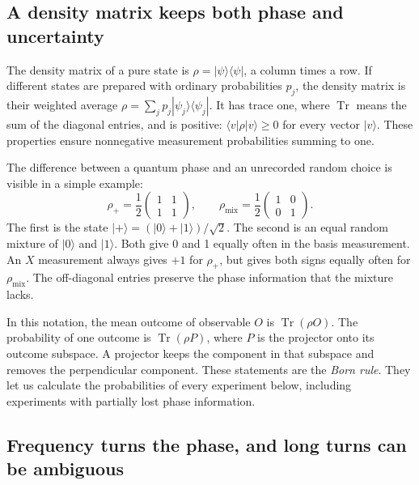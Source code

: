 \documentclass[11pt,a4paper]{article}
\numberwithin{equation}{section}
\theoremstyle{remark}
\DeclareMathOperator{\Tr}{Tr}
\begin{document}
\subsection{A density matrix keeps both phase and uncertainty}

The density matrix of a pure state is
$\rho=|\psi\rangle\langle\psi|$, a column times a row.
If different states are prepared with ordinary probabilities $p_j$, the
density matrix is their weighted average
$\rho=\sum_jp_j|\psi_j\rangle\langle\psi_j|$.
It has trace one, where $\Tr$ means the sum of the diagonal entries, and
is positive: $\langle v|\rho|v\rangle\ge0$ for every vector $|v\rangle$.
These properties ensure nonnegative measurement probabilities summing to one.

The difference between a quantum phase and an unrecorded random choice is
visible in a simple example:
\begin{equation}
 \rho_+=\frac12\begin{pmatrix}1&1\\1&1\end{pmatrix},
 \qquad
 \rho_{\mathrm{mix}}=\frac12\begin{pmatrix}1&0\\0&1\end{pmatrix}.
 \label{intro:mixture}
\end{equation}
The first is the state $|+\rangle=(|0\rangle+|1\rangle)/\sqrt2$.
The second is an equal random mixture of $|0\rangle$ and $|1\rangle$.
Both give 0 and 1 equally often in the basis measurement. An $X$ measurement
always gives $+1$ for $\rho_+$, but gives both signs equally often for
$\rho_{\mathrm{mix}}$. The off-diagonal entries preserve the phase
information that the mixture lacks.

In this notation, the mean outcome of observable $O$ is $\Tr(\rho O)$.
The probability of one outcome is $\Tr(\rho P)$, where $P$ is the projector
onto its outcome subspace. A projector keeps the component in that subspace
and removes the perpendicular component. These statements are the
\emph{Born rule}. They let us calculate the probabilities of every
experiment below, including experiments with partially lost phase information.

\subsection{Frequency turns the phase, and long turns can be ambiguous}
\end{document}
